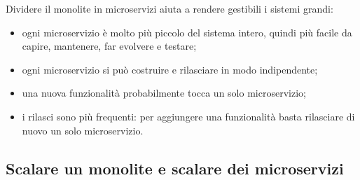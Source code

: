 Dividere il monolite in microservizi aiuta a rendere gestibili i sistemi grandi:
\begin{itemize}
  \item ogni microservizio è molto più piccolo del sistema intero, quindi più facile da capire, mantenere, far evolvere e
        testare;
  \item ogni microservizio si può costruire e rilasciare in modo indipendente;
  \item una nuova funzionalità probabilmente tocca un solo microservizio;
  \item i rilasci sono più frequenti: per aggiungere una funzionalità basta rilasciare di nuovo un solo microservizio.
\end{itemize}

\subsection{Scalare un monolite e scalare dei microservizi}

